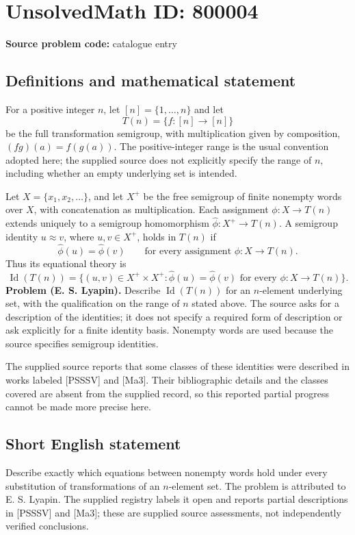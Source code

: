 \documentclass[11pt]{article}
\begin{document}
\section*{UnsolvedMath ID: 800004}
\textbf{Source problem code:} catalogue entry
\subsection{Definitions and mathematical statement}
For a positive integer \(n\), let \([n]=\{1,\ldots,n\}\) and let
\[
T(n)=\{f:[n]\to[n]\}
\]
be the full transformation semigroup, with multiplication given by composition, \((fg)(a)=f(g(a))\). The positive-integer range is the usual convention adopted here; the supplied source does not explicitly specify the range of \(n\), including whether an empty underlying set is intended.

Let \(X=\{x_1,x_2,\ldots\}\), and let \(X^+\) be the free semigroup of finite nonempty words over \(X\), with concatenation as multiplication. Each assignment \(\phi:X\to T(n)\) extends uniquely to a semigroup homomorphism \(\widehat\phi:X^+\to T(n)\). A semigroup identity \(u\approx v\), where \(u,v\in X^+\), holds in \(T(n)\) if
\[
\widehat\phi(u)=\widehat\phi(v)
\qquad\text{for every assignment }\phi:X\to T(n).
\]
Thus its equational theory is
\[
\operatorname{Id}(T(n))=
\bigl\{(u,v)\in X^+\times X^+:
\widehat\phi(u)=\widehat\phi(v)
\text{ for every }\phi:X\to T(n)\bigr\}.
\]
\textbf{Problem (E. S. Lyapin).} Describe \(\operatorname{Id}(T(n))\) for an \(n\)-element underlying set, with the qualification on the range of \(n\) stated above. The source asks for a description of the identities; it does not specify a required form of description or ask explicitly for a finite identity basis. Nonempty words are used because the source specifies semigroup identities.

The supplied source reports that some classes of these identities were described in works labeled [PSSSV] and [Ma3]. Their bibliographic details and the classes covered are absent from the supplied record, so this reported partial progress cannot be made more precise here.
\subsection{Short English statement}
Describe exactly which equations between nonempty words hold under every substitution of transformations of an \(n\)-element set. The problem is attributed to E. S. Lyapin. The supplied registry labels it open and reports partial descriptions in [PSSSV] and [Ma3]; these are supplied source assessments, not independently verified conclusions.
\end{document}
